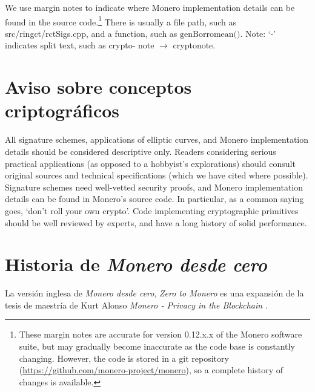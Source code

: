 We use margin notes to indicate where Monero implementation details can be found in the source code.\footnote{These margin notes are accurate for version 0.12.x.x of the Monero software suite, but may gradually become inaccurate as the code base is constantly changing. However, the code is stored in a git repository (\url{https://github.com/monero-project/monero}), so a complete history of changes is available.} There is usually a file path, such as src/ringct/rctSigs.cpp, and a function, such as \(\textrm{genBorromean()}\). Note: `-' indicates split text, such as crypto- note $\rightarrow$ cryptonote.

\section{Aviso sobre conceptos criptográficos}

All signature schemes, applications of elliptic curves, and Monero implementation details should be considered descriptive only. Readers considering serious practical applications (as opposed to a hobbyist's explorations) should consult original sources and technical specifications (which we have cited where possible). Signature schemes need well-vetted security proofs, and Monero implementation details can be found in Monero's source code. In particular, as a common saying goes, `don't roll your own crypto'. Code implementing cryptographic primitives should be well reviewed by experts, and have a long history of solid performance.

\section{Historia de \textit{Monero desde cero}}

La versión inglesa de \textit{Monero desde cero}, \textit{Zero to Monero} es una expansión de la tesis de maestría de Kurt Alonso \textit{Monero - Privacy in the Blockchain} \cite{kurt-original}.